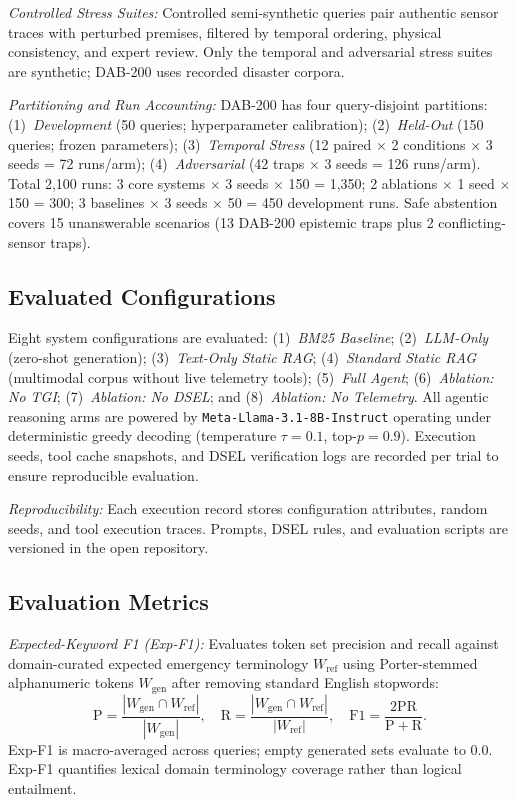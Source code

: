 \documentclass[conference]{IEEEtran}
\begin{document}
\textit{Controlled Stress Suites:} Controlled semi-synthetic queries pair authentic sensor traces with perturbed premises, filtered by temporal ordering, physical consistency, and expert review. Only the temporal and adversarial stress suites are synthetic; DAB-200 uses recorded disaster corpora.

\textit{Partitioning and Run Accounting:} DAB-200 has four query-disjoint partitions: (1)~\textit{Development} (50 queries; hyperparameter calibration); (2)~\textit{Held-Out} (150 queries; frozen parameters); (3)~\textit{Temporal Stress} (12 paired $\times$ 2 conditions $\times$ 3 seeds = 72 runs/arm); (4)~\textit{Adversarial} (42 traps $\times$ 3 seeds = 126 runs/arm). Total 2,100 runs: 3 core systems $\times$ 3 seeds $\times$ 150 = 1,350; 2 ablations $\times$ 1 seed $\times$ 150 = 300; 3 baselines $\times$ 3 seeds $\times$ 50 = 450 development runs. Safe abstention covers 15 unanswerable scenarios (13 DAB-200 epistemic traps plus 2 conflicting-sensor traps).

\subsection{Evaluated Configurations}
Eight system configurations are evaluated: (1)~\textit{BM25 Baseline}; (2)~\textit{LLM-Only} (zero-shot generation); (3)~\textit{Text-Only Static RAG}; (4)~\textit{Standard Static RAG} (multimodal corpus without live telemetry tools); (5)~\textit{Full Agent}; (6)~\textit{Ablation: No TGI}; (7)~\textit{Ablation: No DSEL}; and (8)~\textit{Ablation: No Telemetry}. All agentic reasoning arms are powered by \texttt{Meta-Llama-3.1-8B-Instruct} operating under deterministic greedy decoding (temperature $\tau=0.1$, top-$p=0.9$). Execution seeds, tool cache snapshots, and DSEL verification logs are recorded per trial to ensure reproducible evaluation.

\textit{Reproducibility:} Each execution record stores configuration attributes, random seeds, and tool execution traces. Prompts, DSEL rules, and evaluation scripts are versioned in the open repository.

\subsection{Evaluation Metrics}
\textit{Expected-Keyword F1 (Exp-F1):} Evaluates token set precision and recall against domain-curated expected emergency terminology $W_{\mathrm{ref}}$ using Porter-stemmed alphanumeric tokens $W_{\mathrm{gen}}$ after removing standard English stopwords:
\begin{equation}
\mathrm{P} = \frac{|W_{\mathrm{gen}} \cap W_{\mathrm{ref}}|}{|W_{\mathrm{gen}}|}, \quad
\mathrm{R} = \frac{|W_{\mathrm{gen}} \cap W_{\mathrm{ref}}|}{|W_{\mathrm{ref}}|}, \quad
\mathrm{F1} = \frac{2\mathrm{PR}}{\mathrm{P} + \mathrm{R}}.
\label{eq:f1}
\end{equation}
Exp-F1 is macro-averaged across queries; empty generated sets evaluate to 0.0. Exp-F1 quantifies lexical domain terminology coverage rather than logical entailment.
\end{document}
